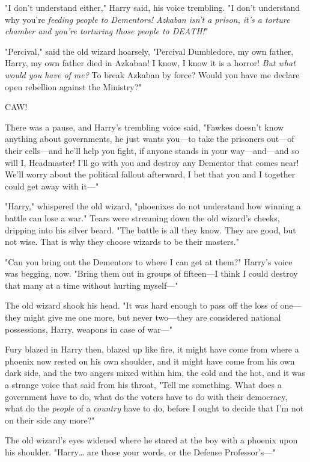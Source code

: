 "I don't understand either," Harry said, his voice trembling. "I don't
understand why you're \emph{feeding people to Dementors! Azkaban isn't a
prison, it's a torture chamber and you're torturing those people to DEATH!}"

"Percival," said the old wizard hoarsely, "Percival Dumbledore, my own father,
Harry, my own father died in Azkaban! I know, I know it is a horror! \emph{But
what would you have of me?} To break Azkaban by force? Would you have me
declare open rebellion against the Ministry?"

CAW!

There was a pause, and Harry's trembling voice said, "Fawkes doesn't know
anything about governments, he just wants you---to take the prisoners out---of
their cells---and he'll help you fight, if anyone stands in your
way---and---and so will I, Headmaster! I'll go with you and destroy any
Dementor that comes near! We'll worry about the political fallout afterward, I
bet that you and I together could get away with it---"

"Harry," whispered the old wizard, "phoenixes do not understand how winning a
battle can lose a war." Tears were streaming down the old wizard's cheeks,
dripping into his silver beard. "The battle is all they know. They are good,
but not wise. That is why they choose wizards to be their masters."

"Can you bring out the Dementors to where I can get at them?" Harry's voice was
begging, now. "Bring them out in groups of fifteen---I think I could destroy
that many at a time without hurting myself---"

The old wizard shook his head. "It was hard enough to pass off the loss of
one---they might give me one more, but never two---they are considered national
possessions, Harry, weapons in case of war---"

Fury blazed in Harry then, blazed up like fire, it might have come from where a
phoenix now rested on his own shoulder, and it might have come from his own
dark side, and the two angers mixed within him, the cold and the hot, and it
was a strange voice that said from his throat, "Tell me something. What does a
government have to do, what do the voters have to do with their democracy, what
do the \emph{people} of a \emph{country} have to do, before I ought to decide
that I'm not on their side any more?"

The old wizard's eyes widened where he stared at the boy with a phoenix upon
his shoulder. "Harry{\ldots} are those your words, or the Defense
Professor's---"

